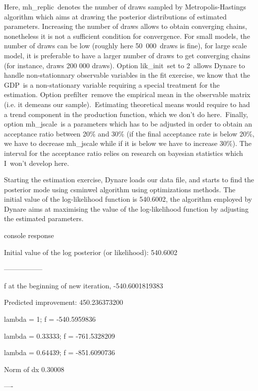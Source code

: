\documentclass[a4paper,12pt]{article}%
\begin{document}
Here, \textsf{mh\_replic}\ denotes the number of draws sampled by
Metropolis-Hastings algorithm which aims at drawing the posterior
distributions of estimated parameters. Increasing the number of draws allows
to obtain converging chains, nonetheless it is not a sufficient condition for
convergence. For small models, the number of draws can be low (roughly here
50\ 000\ draws is fine), for large scale model, it is preferable to have a
larger number of draws to get converging chains (for instance,
\cite{smets2007shocks} draws 200 000 draws). Option \textsf{lik\_init}\ set to
2\ allows Dynare to handle non-stationnary observable variables in the fit
exercise, we know that the GDP\ is a non-stationary variable requiring a
special treatment for the estimation. Option \textsf{prefilter}\ remove the
empirical mean in the observable matrix (i.e. it demeans our
sample).\ Estimating theoretical means would require to had a trend component
in the production function, which we don't do here.\ Finally, option
\textsf{mh\_jscale}\ is a parameters which has to be adjusted in order to
obtain an acceptance ratio between 20\% and 30\% (if the final acceptance rate
is below 20\%, we have to decrease \textsf{mh\_jscale} while if it is below we
have to increase 30\%). The interval for the acceptance ratio relies on
research on bayesian statistics which I\ won't develop here.

Starting the estimation exercise, Dynare loads our data file, and starts to
find the posterior mode using csminwel algorithm using optimizations methods.
The initial value of the log-likelihood function is \textsf{540.6002}, the
algorithm employed by Dynare aims at maximising the value of the
log-likelihood function by adjusting the estimated parameters.%

\vspace{3ex}
\begin{myresult}{console response}%


\textsf{Initial value of the log posterior (or likelihood): 540.6002}

\textsf{-----------------}

\textsf{f at the beginning of new iteration, -540.6001819383}

\textsf{Predicted improvement: 450.236373200}

\textsf{lambda = 1; f = -540.5959836}

\textsf{lambda = 0.33333; f = -761.5328209}

\textsf{lambda = 0.64439; f = -851.6090736}

\textsf{Norm of dx 0.30008}

\textsf{----}%

\end{myresult}
\vspace{3ex}%
\end{document}
